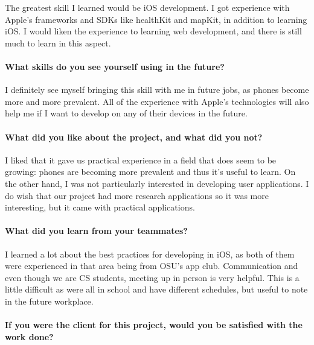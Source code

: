 The greatest skill I learned would be iOS development. I got experience
with Apple's frameworks and SDKs like healthKit and mapKit, in addition
to learning iOS. I would liken the experience to learning web
development, and there is still much to learn in this aspect.

\paragraph{What skills do you see yourself using in the
future?}\label{what-skills-do-you-see-yourself-using-in-the-future}

I definitely see myself bringing this skill with me in future jobs, as
phones become more and more prevalent. All of the experience with
Apple's technologies will also help me if I want to develop on any of
their devices in the future.

\paragraph{What did you like about the project, and what did you
not?}\label{what-did-you-like-about-the-project-and-what-did-you-not}

I liked that it gave us practical experience in a field that does seem
to be growing: phones are becoming more prevalent and thus it's useful
to learn. On the other hand, I was not particularly interested in
developing user applications. I do wish that our project had more
research applications so it was more interesting, but it came with
practical applications.

\paragraph{What did you learn from your
teammates?}\label{what-did-you-learn-from-your-teammates}

I learned a lot about the best practices for developing in iOS, as both
of them were experienced in that area being from OSU's app club.
Communication and even though we are CS students, meeting up in person
is very helpful. This is a little difficult as were all in school and
have different schedules, but useful to note in the future workplace.

\paragraph{If you were the client for this project, would you be satisfied
with the work
done?}\label{if-you-were-the-client-for-this-project-would-you-be-satisfied-with-the-work-done}

